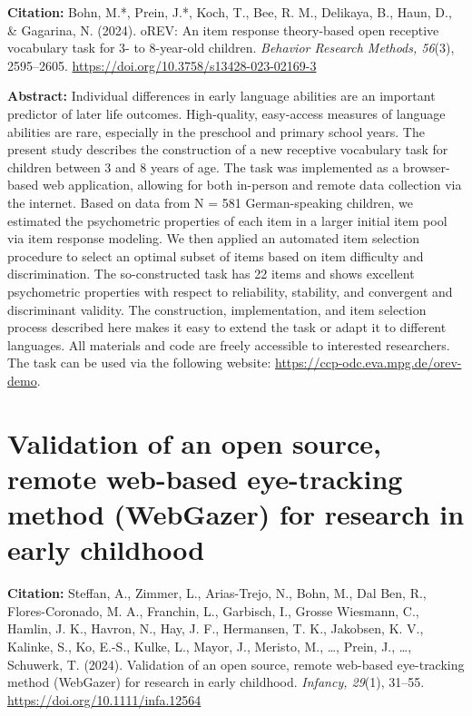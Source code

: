 \documentclass[
]{scrbook}
\begin{document}
\textbf{Citation:} Bohn, M.*, Prein, J.*, Koch, T., Bee, R. M., Delikaya, B., Haun, D., \& Gagarina, N. (2024). oREV: An item response theory-based open receptive vocabulary task for 3- to 8-year-old children. \emph{Behavior Research Methods, 56}(3), 2595--2605. \mbox{\url{https://doi.org/10.3758/s13428-023-02169-3}}

\textbf{Abstract:} Individual differences in early language abilities are an important predictor of later life outcomes. High-quality, easy-access measures of language abilities are rare, especially in the preschool and primary school years. The present study describes the construction of a new receptive vocabulary task for children between 3 and 8 years of age. The task was implemented as a browser-based web application, allowing for both in-person and remote data collection via the internet. Based on data from N = 581 German-speaking children, we estimated the psychometric properties of each item in a larger initial item pool via item response modeling. We then applied an automated item selection procedure to select an optimal subset of items based on item difficulty and discrimination. The so-constructed task has 22 items and shows excellent psychometric properties with respect to reliability, stability, and convergent and discriminant validity. The construction, implementation, and item selection process described here makes it easy to extend the task or adapt it to different languages. All materials and code are freely accessible to interested researchers. The task can be used via the following website: \mbox{\url{https://ccp-odc.eva.mpg.de/orev-demo}}.

\newpage

\section*{Validation of an open source, remote web-based eye-tracking method (WebGazer) for research in early childhood}\label{manywebcams}

\textbf{Citation:} Steffan, A., Zimmer, L., Arias-Trejo, N., Bohn, M., Dal Ben, R., Flores-Coronado, M. A., Franchin, L., Garbisch, I., Grosse Wiesmann, C., Hamlin, J. K., Havron, N., Hay, J. F., Hermansen, T. K., Jakobsen, K. V., Kalinke, S., Ko, E.-S., Kulke, L., Mayor, J., Meristo, M., \ldots, Prein, J., \ldots, Schuwerk, T. (2024). Validation of an open source, remote web-based eye-tracking method (WebGazer) for research in early childhood. \emph{Infancy, 29}(1), 31--55. \mbox{\url{https://doi.org/10.1111/infa.12564}}
\end{document}
